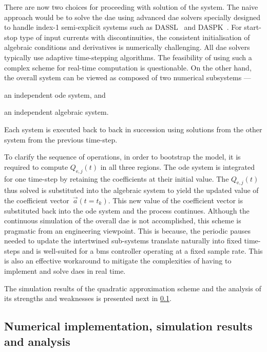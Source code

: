 There are now two choices for proceeding  with solution of the system. The naive
approach  would be  to  solve  the \gls{dae}  using  advanced \gls{dae}  solvers
specially designed to handle \mbox{index-1}  semi-explicit systems such as
DASSL~\cite{Petzolddassl}
and  DASPK~\cite{VanKeken1995}. For  start-stop  type  of input  currents  with discontinuities,  the
consistent initialisation of algebraic conditions and derivatives is numerically
challenging.  All   \gls{dae}  solvers  typically  use   adaptive  time-stepping
algorithms.  The  feasibility of  using  such  a  complex scheme  for  real-time
computation is questionable. On the other hand, the overall system can be viewed
as composed of two numerical subsystems ---
\begin{enumerate*}[label=\emph{\alph*})]
    \item an independent \gls{ode} system, and
    \item an independent algebraic system.
\end{enumerate*}
Each system  is executed  back to  back in succession  using solutions  from the
other system from the previous time-step.

To  clarify  the sequence  of  operations,  in  order  to bootstrap  the  model,
it  is  required  to  compute  $Q_{\text{e},j}(t)$ in  all  three  regions.  The
\gls{ode} system is  integrated for one time-step by  retaining the coefficients
at  their initial  value.  The $Q_{\text{e},j}(t)$  thus  solved is  substituted
into  the  algebraic system  to  yield  the  updated  value of  the  coefficient
vector~$\vec{a}(t=t_k)$. This new value of the coefficient vector is substituted
back  into  the  \gls{ode}  system  and  the  process  continues.  Although  the
continuous simulation of  the overall \gls{dae} is not accomplished,  this scheme is
pragmatic from an engineering viewpoint. This is because,  the periodic pauses needed to update
the intertwined  sub-systems translate  naturally into  fixed time-steps  and is
well-suited for a \gls{bms} controller operating at a fixed sample rate. This is
also an effective workaround to mitigate the complexities of having to implement
and solve \glspl{dae} in real time.

The   simulation   results   of   the   quadratic   approximation   scheme   and
the   analysis   of   its   strengths   and   weaknesses   is   presented   next
in \cref{subsec:quadraticsimresultsanalysis}.

\subsection{Numerical implementation, simulation results and analysis}\label{subsec:quadraticsimresultsanalysis}

